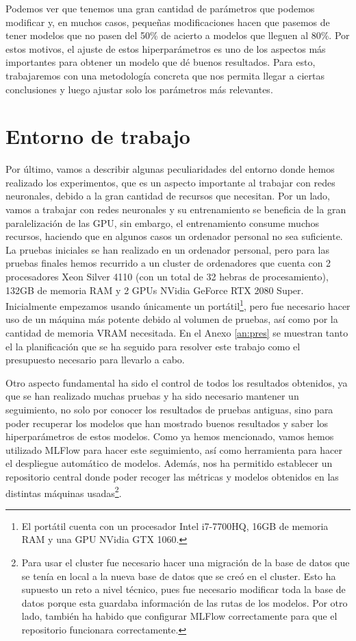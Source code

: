 \documentclass[a4paper,12pt,oneside,titlepage]{book}
\begin{document}
Podemos ver que tenemos una gran cantidad de parámetros que podemos modificar y, en muchos casos, pequeñas modificaciones hacen que pasemos de tener modelos que no pasen del 50\% de acierto a modelos que lleguen al 80\%. Por estos motivos, el ajuste de estos hiperparámetros es uno de los aspectos más importantes para obtener un modelo que dé buenos resultados. Para esto, trabajaremos con una metodología concreta que nos permita llegar a ciertas conclusiones y luego ajustar solo los parámetros más relevantes.

\section{Entorno de trabajo}

Por último, vamos a describir algunas peculiaridades del entorno donde hemos realizado los experimentos, que es un aspecto importante al trabajar con redes neuronales, debido a la gran cantidad de recursos que necesitan. Por un lado, vamos a trabajar con redes neuronales y su entrenamiento se beneficia de la gran paralelización de las GPU, sin embargo, el entrenamiento consume muchos recursos, haciendo que en algunos casos un ordenador personal no sea suficiente. La pruebas iniciales se han realizado en un ordenador personal, pero para las pruebas finales hemos recurrido a un cluster de ordenadores que cuenta con 2 procesadores Xeon Silver 4110 (con un total de 32 hebras de procesamiento), 132GB de memoria RAM y 2 GPUs NVidia GeForce RTX 2080 Super. Inicialmente empezamos usando únicamente un portátil\footnote{El portátil cuenta con un procesador Intel i7-7700HQ, 16GB de memoria RAM y una GPU NVidia GTX 1060.}, pero fue necesario hacer uso de un máquina más potente debido al volumen de pruebas, así como por la cantidad de memoria VRAM necesitada. En el Anexo \ref{an:pres} se muestran tanto el la planificación que se ha seguido para resolver este trabajo como el presupuesto necesario para llevarlo a cabo.
 
Otro aspecto fundamental ha sido el control de todos los resultados obtenidos, ya que se han realizado muchas pruebas y ha sido necesario mantener un seguimiento, no solo por conocer los resultados de pruebas antiguas, sino para poder recuperar los modelos que han mostrado buenos resultados y saber los hiperparámetros de estos modelos. Como ya hemos mencionado, vamos hemos utilizado MLFlow para hacer este seguimiento, así como herramienta para hacer el despliegue automático de modelos. Además, nos ha permitido establecer un repositorio central donde poder recoger las métricas y modelos obtenidos en las distintas máquinas usadas\footnote{Para usar el cluster fue necesario hacer una migración de la base de datos que se tenía en local a la nueva base de datos que se creó en el cluster. Esto ha supuesto un reto a nivel técnico, pues fue necesario modificar toda la base de datos porque esta guardaba información de las rutas de los modelos. Por otro lado, también ha habido que configurar MLFlow correctamente para que el repositorio funcionara correctamente.}.
\end{document}
